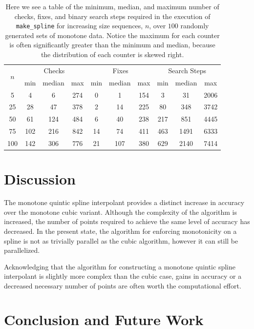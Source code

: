 \documentclass{scspaperproc}
\theoremstyle{scsthe}
\begin{document}
\begin{table}
  \centering
  \begin{tabular}{c|c c c|c c c|c c c}
    \hline
    \multirow{2}{*}{$n$}
      & \multicolumn{3}{c|}{Checks} & \multicolumn{3}{c}{Fixes} & \multicolumn{3}{|c}{Search Steps} \\
      & min & median & max & min & median & max & min & median & max \\
    \hline
    5 & 4 & 6 & 274 & 0 & 1 & 154 & 3 & 31 & 2006\\
    25 & 28 & 47 & 378 & 2 & 14 & 225 & 80 & 348 & 3742\\
    50 & 61 & 124 & 484 & 6 & 40 & 238 & 217 & 851 & 4445\\
    75 & 102 & 216 & 842 & 14 & 74 & 411 & 463 & 1491 & 6333\\
    100 & 142 & 306 & 776 & 21 & 107 & 380 & 629 & 2140 & 7414\\
    \hline
  \end{tabular}
  \caption{Here we see a table of the minimum, median, and maximum number of checks, fixes, and binary search steps required in the execution of \texttt{make\_spline} for increasing size sequences, $n$, over $100$ randomly generated sets of monotone data. Notice the maximum for each counter is often significantly greater than the minimum and median, because the distribution of each counter is skewed right.}
  \label{table:e3_results}
\end{table}

\section{Discussion}
\label{sec:discussion}

The monotone quintic spline interpolant provides a distinct increase in accuracy over the monotone cubic variant. Although the complexity of the algorithm is increased, the number of points required to achieve the same level of accuracy has decreased. In the present state, the algorithm for enforcing monotonicity on a spline is not as trivially parallel as the cubic algorithm, however it can still be parallelized.

Acknowledging that the algorithm for constructing a monotone quintic spline interpolant is slightly more complex than the cubic case, gains in accuracy or a decreased necessary number of points are often worth the computational effort.

\section{Conclusion and Future Work}
\label{sec:conclusion}
\end{document}
